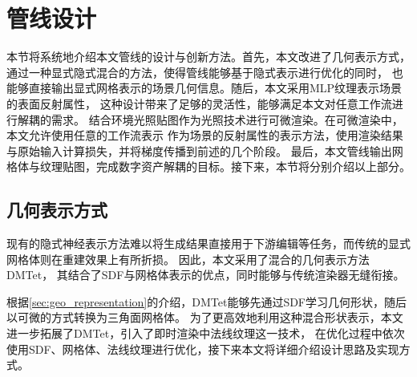 \section{管线设计}
本节将系统地介绍本文管线的设计与创新方法。首先，本文改进了几何表示方式，
通过一种显式隐式混合的方法，使得管线能够基于隐式表示进行优化的同时，
也能够直接输出显式网格表示的场景几何信息。随后，本文采用MLP纹理表示场景的表面反射属性，
这种设计带来了足够的灵活性，能够满足本文对任意工作流进行解耦的需求。
结合环境光照贴图作为光照技术进行可微渲染。在可微渲染中，本文允许使用任意的工作流表示
作为场景的反射属性的表示方法，使用渲染结果与原始输入计算损失，并将梯度传播到前述的几个阶段。
最后，本文管线输出网格体与纹理贴图，完成数字资产解耦的目标。接下来，本节将分别介绍以上部分。

\subsection{几何表示方式}

现有的隐式神经表示方法难以将生成结果直接用于下游编辑等任务，而传统的显式网格体则在重建效果上有所折损。
因此，本文采用了混合的几何表示方法DMTet\cite{shen2021deep}，
其结合了SDF与网格体表示的优点，同时能够与传统渲染器无缝衔接。

根据\ref{sec:geo_representation}的介绍，DMTet能够先通过SDF学习几何形状，随后以可微的方式转换为三角面网格体。
为了更高效地利用这种混合形状表示，本文进一步拓展了DMTet，引入了即时渲染中法线纹理这一技术，
在优化过程中依次使用SDF、网格体、法线纹理进行优化，接下来本文将详细介绍设计思路及实现方式。

